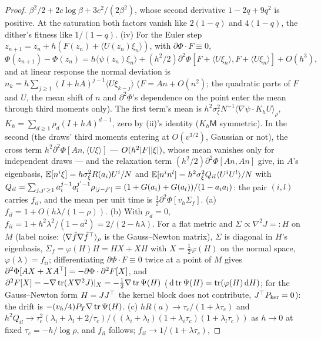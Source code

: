 \begin{proof}
$\beta^2/2 + 2c\log\beta + 3c^2/(2\beta^2)$, whose second derivative $1 - 2q + 9q^2$ is positive. At the saturation
both factors vanish like $2(1 - q)$ and $4(1 - q)$, the dither's fitness like $1/(1 - q)$. (iv) For the Euler step
$z_{n+1} = z_n + h(F(z_n) + \langle U(z_n)\xi_n\rangle)$, with $\partial\Phi\cdot F\equiv0$,
\[
  \Phi(z_{n+1}) - \Phi(z_n) = h\langle\psi(z_n)\xi_n\rangle
  + (h^2/2)\partial^2\Phi[F + \langle U\xi_n\rangle,F + \langle U\xi_n\rangle] + O(h^3),
\]
and at linear response the normal deviation is $n_k = h\sum_{j\ge1}(I + hA)^{j-1}\langle U\xi_{k-j}\rangle$
($F = An + O(n^2)$; the quadratic parts of $F$ and $U$, the mean shift of $n$ and $\partial^2\Phi$'s dependence on the
point enter the mean through third moments only). The first term's mean is
$h^2\sigma_\xi^2N^{-1}\langle\nabla\psi\cdot K_hU\rangle_\rho$, $K_h = \sum_{d\ge1}\rho_d(I + hA)^{d-1}$, zero by (ii)'s
identity ($K_h\mathsf M$ symmetric). In the second (the draws' third moments entering at $O(v^{3/2})$, Gaussian or
not), the cross term $h^2\partial^2\Phi[An,\langle U\xi\rangle]$ --- $O(h^2\lvert F\rvert\lvert \xi\rvert)$, whose mean vanishes only for
independent draws --- and the relaxation term $(h^2/2)\partial^2\Phi[An,An]$ give, in $A$'s eigenbasis,
$\mathbb{E}[n^i\xi] = h\sigma_\xi^2R(a_i)U^i/N$ and $\mathbb{E}[n^in^l] = h^2\sigma_\xi^2Q_{il}\langle U^iU^l\rangle/N$ with
$Q_{il} = \sum_{j,j'\ge1}a_i^{j-1}a_l^{j'-1}\rho_{\lvert j-j'\rvert} = (1 + G(a_i) + G(a_l))/(1 - a_ia_l)$: the pair $(i,l)$
carries $f_{il}$, and the mean per unit time is $\tfrac12\partial^2\Phi[v_h\Sigma_f]$. (a)
$f_{il} = 1 + O(h\lambda/(1 - \rho))$. (b) With $\rho_d = 0$, $f_{ii} = 1 + h^2\lambda^2/(1 - a^2) = 2/(2 - h\lambda)$.
For a flat metric and $\Sigma\propto\nabla^2J =: H$ on $M$ (label noise: $\langle\nabla\hat f\nabla\hat f^\top\rangle_\rho$
is the Gauss--Newton matrix), $\Sigma$ is diagonal in $H$'s eigenbasis, $\Sigma_f = \varphi(H)H = HX + XH$ with
$X = \tfrac12\varphi(H)$ on the normal space, $\varphi(\lambda) = f_{ii}$; differentiating $\partial\Phi\cdot F\equiv0$
twice at a point of $M$ gives $\partial^2\Phi[AX + XA^\top] = -\partial\Phi\cdot\partial^2F[X]$, and
$\partial^2F[X] = -\nabla\operatorname{tr}(X\nabla^2J)|_X = -\tfrac12\nabla\operatorname{tr}\Psi(H)$
($\,\mathrm{d}\operatorname{tr}\Psi(H) = \operatorname{tr}(\varphi(H)\,\mathrm{d} H)$; for the Gauss--Newton form $H = JJ^\top$ the kernel block does not contribute,
$J^\top P_{\ker} = 0$): the drift is $-(v_h/4)P_T\nabla\operatorname{tr}\Psi(H)$. (c) $hR(a)\to\tau_c/(1 + \lambda\tau_c)$ and
$h^2Q_{il}\to\tau_c^2(\lambda_i + \lambda_l + 2/\tau_c)/((\lambda_i + \lambda_l)(1 + \lambda_i\tau_c)(1 + \lambda_l\tau_c))$
as $h\to0$ at fixed $\tau_c = -h/\log\rho$, and $f_{il}$ follows; $f_{ii}\to1/(1 + \lambda\tau_c)$,

\end{proof}
